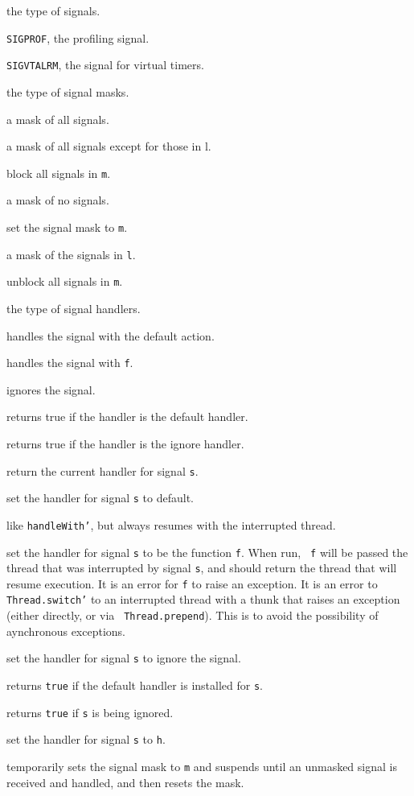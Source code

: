 \begin{description}

 the type of signals.

{\tt SIGPROF}, the profiling signal.

{\tt SIGVTALRM}, the signal for virtual timers.

 the type of signal masks.

 a mask of all signals.

 a mask of all signals except for those in l.

 block all signals in {\tt m}.

 a mask of no signals.

 set the signal mask to {\tt m}.

 a mask of the signals in {\tt l}.

 unblock all signals in {\tt m}.

 the type of signal handlers.

 handles the signal with the default action.

 handles the signal with {\tt f}.

 ignores the signal.

 returns true if the handler is the default handler.

 returns true if the handler is the ignore handler.

 return the current handler for signal {\tt s}.

 set the handler for signal {\tt s} to default.

 like {\tt handleWith'}, but always resumes with the
interrupted thread.

set the handler for signal {\tt s} to be the function {\tt f}.  When run, {\tt
f} will be passed the thread that was interrupted by signal {\tt s}, and should
return the thread that will resume execution.  It is an error for {\tt f} to
raise an exception.  It is an error to {\tt Thread.switch'} to an interrupted
thread with a thunk that raises an exception (either directly, or via {\tt
Thread.prepend}).  This is to avoid the possibility of aynchronous exceptions.

 set the handler for signal {\tt s} to ignore the signal.

 returns {\tt true} if the default handler
is installed for {\tt s}.

 returns {\tt true} if {\tt s} is being ignored.

 set the handler for signal {\tt s} to {\tt h}.

temporarily sets the signal mask to {\tt m} and suspends until an
unmasked signal is received and handled, and then resets the mask.
\end{description}
%
